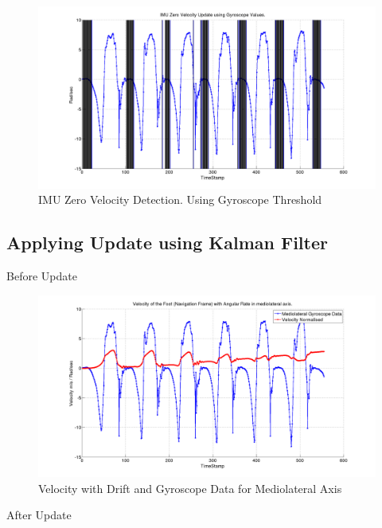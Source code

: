 \documentclass[12pt]{article}
\begin{document}
\begin{figure}[!htb]
\centering
\includegraphics[scale=.3]{imuzerovelocitygyro.png}
\caption{IMU Zero Velocity Detection. Using Gyroscope Threshold}
\label{imuzerovelocitygyro}
\end{figure}

\FloatBarrier

\subsection*{Applying Update using Kalman Filter}

Before Update

\begin{figure}[!htb]
\centering
\includegraphics[scale=.3]{velocityDriftGyro.png}
\caption{Velocity with Drift and Gyroscope Data for Mediolateral Axis}
\label{velocityDriftGyro}
\end{figure}

\FloatBarrier

After Update
\end{document}
